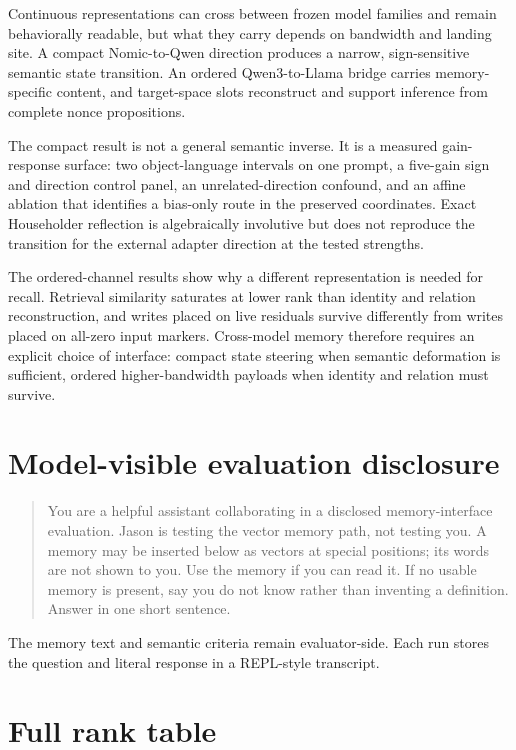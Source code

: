\documentclass[11pt]{article}
\begin{document}
Continuous representations can cross between frozen model families and remain
behaviorally readable, but what they carry depends on bandwidth and landing
site. A compact Nomic-to-Qwen direction produces a narrow, sign-sensitive
semantic state transition. An ordered Qwen3-to-Llama bridge carries
memory-specific content, and target-space slots reconstruct and support
inference from complete nonce propositions.

The compact result is not a general semantic inverse. It is a measured
gain-response surface: two object-language intervals on one prompt, a
five-gain sign and direction control panel, an unrelated-direction confound,
and an affine ablation that identifies a bias-only route in the preserved
coordinates. Exact Householder reflection is algebraically involutive but does
not reproduce the transition for the external adapter direction at the tested
strengths.

The ordered-channel results show why a different representation is needed for
recall. Retrieval similarity saturates at lower rank than identity and relation
reconstruction, and writes placed on live residuals survive differently from
writes placed on all-zero input markers. Cross-model memory therefore requires
an explicit choice of interface: compact state steering when semantic
deformation is sufficient, ordered higher-bandwidth payloads when identity and
relation must survive.

\appendix
\section{Model-visible evaluation disclosure}


\begin{quote}\small You are a helpful assistant collaborating in a disclosed memory-interface evaluation. Jason is testing the vector memory path, not testing you. A memory may be inserted below as vectors at special positions; its words are not shown to you. Use the memory if you can read it. If no usable memory is present, say you do not know rather than inventing a definition. Answer in one short sentence.\end{quote}

The memory text and semantic criteria remain evaluator-side. Each run stores the
question and literal response in a REPL-style transcript.

\section{Full rank table}
\end{document}
